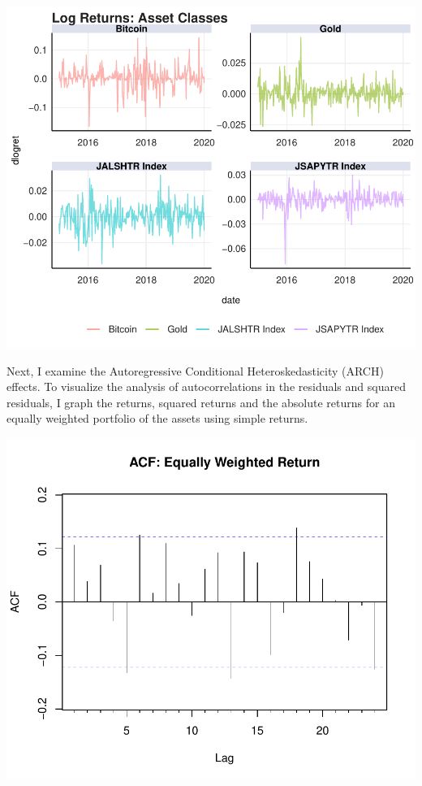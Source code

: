 \documentclass[11pt,preprint, authoryear]{elsarticle}
\numberwithin{equation}{section}
\numberwithin{figure}{section}
\numberwithin{table}{section}
\begin{document}
\includegraphics{FinMetrics-Essay_files/figure-latex/unnamed-chunk-2-1.pdf}

Next, I examine the Autoregressive Conditional Heteroskedasticity (ARCH)
effects. To visualize the analysis of autocorrelations in the residuals
and squared residuals, I graph the returns, squared returns and the
absolute returns for an equally weighted portfolio of the assets using
simple returns.

\includegraphics{FinMetrics-Essay_files/figure-latex/unnamed-chunk-4-1.pdf}
\end{document}

